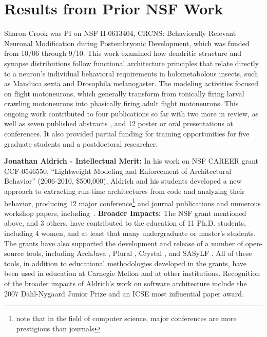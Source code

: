 \documentclass[11pt,letterpaper]{article}
\newcommand{\bfhead}[1]{\noindent \textbf{#1:}}
\begin{document}
\section{Results from Prior NSF Work}
Sharon Crook was PI on NSF II-0613404, CRCNS: Behaviorally Relevant Neuronal Modification during Postembryonic Development, which was funded from 10/06 through 9/10. This work examined how dendritic structure and synapse distributions follow functional architecture principles that relate directly to a neuron’s individual behavioral requirements in holometabolous insects, such as Manduca sexta and Drosophila melanogaster. The modeling activities focused on flight motoneurons, which generally transform from tonically firing larval crawling motoneurons into phasically firing adult flight motoneurons. This ongoing work contributed to four publications so far \cite{hohensee,meseke,herrera-valdez_2012,herrera-valdez_jcns_2013} with two more in review, as well as seven published abstracts \cite{jennings_2007,herrera-valdez_2009,berger_2009,herrera-valdez_2010,smith_2011,berger_2012,berger_2013}, and 12 poster or oral presentations at conferences. It also provided partial funding for training opportunities for five graduate students and a postdoctoral researcher.


\bfhead{Jonathan Aldrich - Intellectual Merit} In his work on NSF CAREER grant
CCF-0546550, ``Lightweight Modeling and Enforcement of
Architectural Behavior'' (2006-2010, \$500,000), Aldrich and his
students developed a new approach to extracting
run-time architectures from code and analyzing their
behavior, producing 12 major conference\footnote{note that in the field of computer science, major conferences are more prestigious than journals} and journal publications and numerous workshop papers,
including~\cite{AAC07,bierhoff07:modular_typestate_checking,AAN+08,AA07a,AA07b,AA08d,AA09a,AA09b,AB10}.
\textbf{Broader Impacts:} The NSF grant mentioned above, and 3 others, have contributed to the education of 11 Ph.D. students, including 4 women, and at least that many undergraduate or master's students.  The grants have also supported the development and release of a number of open-source tools,
including ArchJava \cite{ArchJava}, Plural \cite{pluraltool}, Crystal \cite{Crystal}, and SASyLF
\cite{SASyLF}. All of these tools, in addition to educational methodologies developed in the grants, have been used in education at
Carnegie Mellon and at other institutions.  Recognition of the broader impacts of
Aldrich's work on software architecture include the 2007 Dahl-Nygaard
Junior Prize and an ICSE most influential paper award.







\listoftodos
\end{document}
